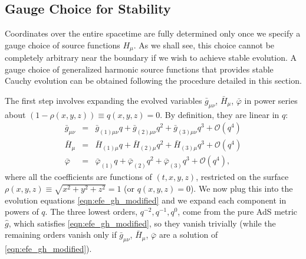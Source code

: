 \documentclass[a4paper,11pt]{article}
\numberwithin{equation}{section}
\begin{document}
\subsection{Gauge Choice for Stability}\label{sec:gauge_choice}

Coordinates over the entire spacetime are fully determined only once we specify a gauge choice of source functions $H_\mu$. As we shall see, this choice cannot be completely arbitrary near the boundary if we wish to achieve stable evolution. A gauge choice of generalized harmonic source functions that provides stable Cauchy evolution can be obtained following the procedure detailed in this section.

The first step involves expanding the evolved variables $\bar{g}_{\mu \nu}$, $\bar{H}_{\mu}$, $\bar{\varphi}$ in power series about $(1-\rho(x,y,z)) \equiv q(x,y,z) = 0$. By definition, they are linear in $q$:
\begin{eqnarray}\label{eqn:qexp}
\bar{g}_{\mu \nu} &=& \bar{g}_{(1) \mu \nu} q + \bar{g}_{(2) \mu \nu} q^2 + \bar{g}_{(3) \mu \nu} q^3 + \mathcal{O}(q^4) \nonumber \\
\bar{H}_{\mu} &=& \bar{H}_{(1) \mu} q + \bar{H}_{(2) \mu} q^2 + \bar{H}_{(3) \mu} q^3 + \mathcal{O}(q^4) \nonumber \\
\bar{\varphi} &=& \bar{\varphi}_{(1)} q + \bar{\varphi}_{(2)} q^2 + \bar{\varphi}_{(3)} q^3 + \mathcal{O}(q^4),
\end{eqnarray}
where all the coefficients are functions of $(t,x,y,z)$, restricted on the surface $\rho(x,y,z)\equiv\sqrt{x^2+y^2+z^2}=1$ (or $q(x,y,z)=0$). We now plug this into the evolution equations \eqref{eqn:efe_gh_modified} and we expand each component in powers of $q$. The three lowest orders, $q^{-2},q^{-1},q^0$, come from the pure AdS metric $\hat{g}$, which satisfies \eqref{eqn:efe_gh_modified}, so they vanish trivially (while the remaining orders vanish only if $\bar{g}_{\mu \nu}$, $\bar{H}_{\mu}$, $\bar{\varphi}$ are a solution of \eqref{eqn:efe_gh_modified}).
\end{document}
